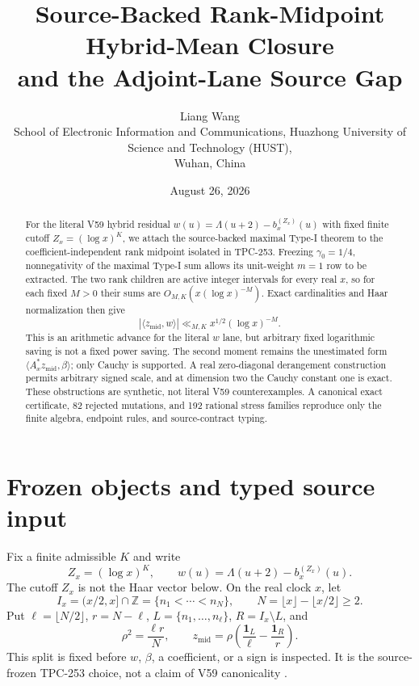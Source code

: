 \documentclass[10pt]{article}
\title{Source-Backed Rank-Midpoint Hybrid-Mean Closure\\
and the Adjoint-Lane Source Gap}
\author{Liang Wang\\
\small School of Electronic Information and Communications, Huazhong University of Science and Technology (HUST),\\
\small Wuhan, China}
\date{August 26, 2026}
\newcommand{\Z}{\mathbb Z}
\newcommand{\one}{\mathbf 1}
\newcommand{\ip}[2]{\langle #1,#2\rangle}
\newcommand{\zm}{z_{\mathrm{mid}}}
\newcommand{\Ax}{A_x}
\begin{document}
\maketitle

\begin{abstract}
For the literal V59 hybrid residual
$w(u)=\Lambda(u+2)-b_x^{(Z_x)}(u)$ with fixed finite cutoff
$Z_x=(\log x)^K$, we attach the source-backed maximal Type-I theorem to the
coefficient-independent rank midpoint isolated in TPC-253.  Freezing
$\gamma_0=1/4$, nonnegativity of the maximal Type-I sum allows its
unit-weight $m=1$ row to be extracted.  The two rank children are active
integer intervals for every real $x$, so for each fixed $M>0$ their sums are
$O_{M,K}(x(\log x)^{-M})$.  Exact cardinalities and Haar normalization then
give
\[
 |\ip{\zm}w|\ll_{M,K}x^{1/2}(\log x)^{-M}.
\]
This is an arithmetic advance for the literal $w$ lane, but arbitrary fixed
logarithmic saving is not a fixed power saving.  The second moment remains
the unestimated form $\ip{\Ax^*\zm}\beta$; only Cauchy is supported.  A real
zero-diagonal derangement construction permits arbitrary signed scale, and
at dimension two the Cauchy constant one is exact.  These obstructions are
synthetic, not literal V59 counterexamples.  A canonical exact certificate,
82 rejected mutations, and 192 rational stress families reproduce only the
finite algebra, endpoint rules, and source-contract typing.
\end{abstract}

\section{Frozen objects and typed source input}

Fix a finite admissible $K$ and write
\begin{equation}
 Z_x=(\log x)^K,\qquad
 w(u)=\Lambda(u+2)-b_x^{(Z_x)}(u).                    \label{eq:residual}
\end{equation}
The cutoff $Z_x$ is not the Haar vector below.  On the real clock $x$, let
\begin{equation}
 I_x=(x/2,x]\cap\Z=\{n_1<\cdots<n_N\},\qquad
 N=\lfloor x\rfloor-\lfloor x/2\rfloor\geq2.          \label{eq:clock}
\end{equation}
Put $\ell=\lfloor N/2\rfloor$, $r=N-\ell$,
$L=\{n_1,\ldots,n_\ell\}$, $R=I_x\setminus L$, and
\begin{equation}
 \rho^2=\frac{\ell r}{N},\qquad
 \zm=\rho\left(\frac{\one_L}{\ell}-\frac{\one_R}{r}\right).       \label{eq:haar}
\end{equation}
This split is fixed before $w$, $\beta$, a coefficient, or a sign is
inspected.  It is the source-frozen TPC-253 choice, not a claim of V59
canonicality \cite{tpc253}.
\end{document}

